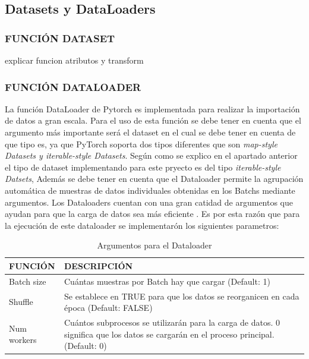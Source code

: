 		\subsection{Datasets y DataLoaders}
			\subsubsection{\MakeUppercase{Función Dataset}}
			explicar funcion atributos y transform
			
			\newpage
			\subsubsection{\MakeUppercase{Función Dataloader}}
			La función DataLoader de Pytorch es implementada para realizar la importación de datos a gran escala. Para el uso de esta función se debe tener en cuenta que el argumento más importante será el dataset en el cual se debe tener en cuenta de que tipo es, ya que PyTorch soporta dos tipos diferentes que son \textit{map-style Datasets y iterable-style Datasets}. 
			Según como se explico en el apartado anterior el tipo de dataset implementando para este pryecto es del tipo \textit{iterable-style Datsets}, Además se debe tener en cuenta que el Dataloader permite la agrupación automática de muestras de datos individuales obtenidas en los Batchs mediante argumentos. 
			Los Dataloaders cuentan con una gran catidad de argumentos que ayudan para que la carga de datos sea más eficiente \cite{Pytorch}. Es por esta razón que para la ejecución de este dataloader se implementarón los siguientes parametros:
			
			\begin{table}[ht]
				\centering
				\begin{tabular}{|p{3cm}|p{8cm}|}
					\hline
					FUNCIÓN & DESCRIPCIÓN \\ 
					\hline
					Batch size & Cuántas muestras por Batch hay que cargar (Default: 1)\\
					\hline
					Shuffle & Se establece en TRUE para que los datos se reorganicen en cada época (Default: FALSE)  \\
					\hline
					Num workers & Cuántos subprocesos se utilizarán para la carga de datos. 0 significa que los datos se cargarán en el proceso principal. (Default: 0)\\
					\hline
				\end{tabular}	
				\caption{Argumentos para el Dataloader}
				\label{table:Argumentos}
			\end{table}
		
